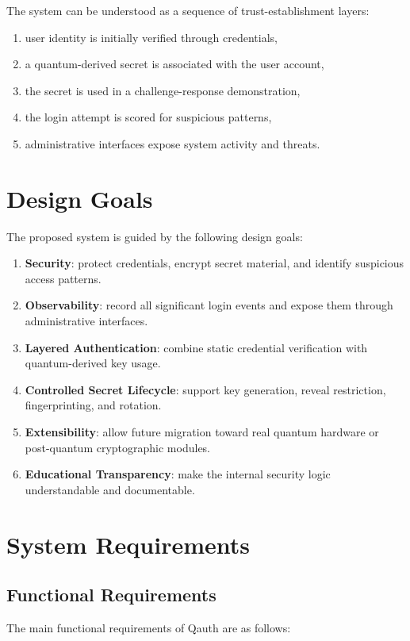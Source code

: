 \documentclass[12pt,a4paper]{report}
\begin{document}
The system can be understood as a sequence of trust-establishment layers:

\begin{enumerate}
    \item user identity is initially verified through credentials,
    \item a quantum-derived secret is associated with the user account,
    \item the secret is used in a challenge-response demonstration,
    \item the login attempt is scored for suspicious patterns,
    \item administrative interfaces expose system activity and threats.
\end{enumerate}

\section{Design Goals}
The proposed system is guided by the following design goals:

\begin{enumerate}
    \item \textbf{Security}: protect credentials, encrypt secret material, and identify suspicious access patterns.
    \item \textbf{Observability}: record all significant login events and expose them through administrative interfaces.
    \item \textbf{Layered Authentication}: combine static credential verification with quantum-derived key usage.
    \item \textbf{Controlled Secret Lifecycle}: support key generation, reveal restriction, fingerprinting, and rotation.
    \item \textbf{Extensibility}: allow future migration toward real quantum hardware or post-quantum cryptographic modules.
    \item \textbf{Educational Transparency}: make the internal security logic understandable and documentable.
\end{enumerate}

\section{System Requirements}

\subsection{Functional Requirements}
The main functional requirements of Qauth are as follows:
\end{document}
